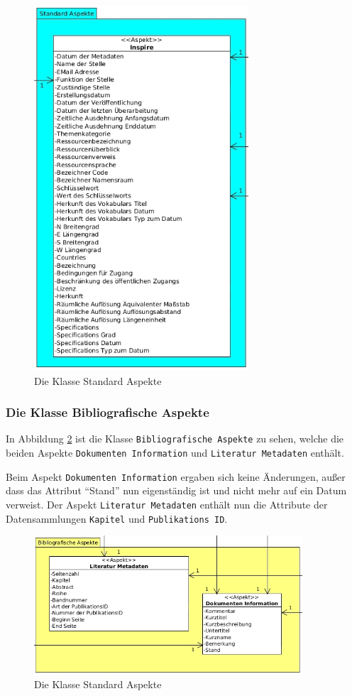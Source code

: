 \begin{figure}[!ht]
\centering
\includegraphics[width=8cm]{Bilder/AlfrescoModell/Standard-Aspekte.jpg}
\caption{Die Klasse Standard Aspekte}
\label{Klasse Standard Aspekte}
\centering
\end{figure}

\FloatBarrier
\subsubsection{Die Klasse Bibliografische Aspekte} \label{Die Klasse Bibliografische Aspekte}
In Abbildung \ref{Klasse Bibligrafische Aspekte} ist die Klasse \texttt{Bibliografische Aspekte} zu sehen, welche die beiden Aspekte \texttt{Dokumenten Information} und \texttt{Literatur Metadaten} enth\"alt.

Beim Aspekt \texttt{Dokumenten Information} ergaben sich keine \"Anderungen, au\ss{}er dass das Attribut "`Stand"' nun eigenst\"andig ist und nicht mehr auf ein Datum verweist. Der Aspekt \texttt{Literatur Metadaten} enth\"alt nun die Attribute der Datensammlungen \texttt{Kapitel} und \texttt{Publikations ID}.

\begin{figure}[!ht]
\centering
\includegraphics[width=10cm]{Bilder/AlfrescoModell/Bibliografische-Aspekte.jpg}
\caption{Die Klasse Standard Aspekte}
\label{Klasse Bibligrafische Aspekte}
\centering
\end{figure}

